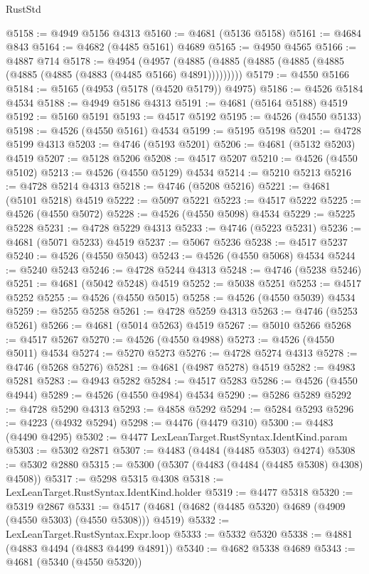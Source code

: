 \begin{lexlean}{RustStd}
\begin{coremodule}
@5158 := @4949 @5156 @4313
@5160 := @4681 (@5136 @5158)
@5161 := @4684 @843
@5164 := @4682 (@4485 @5161) @4689
@5165 := @4950 @4565
@5166 := @4887 @714
@5178 := @4954
    (@4957 (@4885 (@4885 (@4885 (@4885 (@4885 (@4885 (@4885 (@4883 (@4485 @5166) @4891)))))))))
@5179 := @4550 @5166
@5184 := @5165 (@4953 (@5178 (@4520 @5179)) @4975)
@5186 := @4526 @5184 @4534
@5188 := @4949 @5186 @4313
@5191 := @4681 (@5164 @5188) @4519
@5192 := @5160 @5191
@5193 := @4517 @5192
@5195 := @4526 (@4550 @5133)
@5198 := @4526 (@4550 @5161) @4534
@5199 := @5195 @5198
@5201 := @4728 @5199 @4313
@5203 := @4746 (@5193 @5201)
@5206 := @4681 (@5132 @5203) @4519
@5207 := @5128 @5206
@5208 := @4517 @5207
@5210 := @4526 (@4550 @5102)
@5213 := @4526 (@4550 @5129) @4534
@5214 := @5210 @5213
@5216 := @4728 @5214 @4313
@5218 := @4746 (@5208 @5216)
@5221 := @4681 (@5101 @5218) @4519
@5222 := @5097 @5221
@5223 := @4517 @5222
@5225 := @4526 (@4550 @5072)
@5228 := @4526 (@4550 @5098) @4534
@5229 := @5225 @5228
@5231 := @4728 @5229 @4313
@5233 := @4746 (@5223 @5231)
@5236 := @4681 (@5071 @5233) @4519
@5237 := @5067 @5236
@5238 := @4517 @5237
@5240 := @4526 (@4550 @5043)
@5243 := @4526 (@4550 @5068) @4534
@5244 := @5240 @5243
@5246 := @4728 @5244 @4313
@5248 := @4746 (@5238 @5246)
@5251 := @4681 (@5042 @5248) @4519
@5252 := @5038 @5251
@5253 := @4517 @5252
@5255 := @4526 (@4550 @5015)
@5258 := @4526 (@4550 @5039) @4534
@5259 := @5255 @5258
@5261 := @4728 @5259 @4313
@5263 := @4746 (@5253 @5261)
@5266 := @4681 (@5014 @5263) @4519
@5267 := @5010 @5266
@5268 := @4517 @5267
@5270 := @4526 (@4550 @4988)
@5273 := @4526 (@4550 @5011) @4534
@5274 := @5270 @5273
@5276 := @4728 @5274 @4313
@5278 := @4746 (@5268 @5276)
@5281 := @4681 (@4987 @5278) @4519
@5282 := @4983 @5281
@5283 := @4943 @5282
@5284 := @4517 @5283
@5286 := @4526 (@4550 @4944)
@5289 := @4526 (@4550 @4984) @4534
@5290 := @5286 @5289
@5292 := @4728 @5290 @4313
@5293 := @4858 @5292
@5294 := @5284 @5293
@5296 := @4223 (@4932 @5294)
@5298 := @4476 (@4479 @310)
@5300 := @4483 (@4490 @4295)
@5302 := @4477 LexLeanTarget.RustSyntax.IdentKind.param
@5303 := @5302 @2871
@5307 := @4483 (@4484 (@4485 @5303) @4274)
@5308 := @5302 @2880
@5315 := @5300 (@5307 (@4483 (@4484 (@4485 @5308) @4308) @4508))
@5317 := @5298 @5315 @4308
@5318 := LexLeanTarget.RustSyntax.IdentKind.holder
@5319 := @4477 @5318
@5320 := @5319 @2867
@5331 := @4517 (@4681 (@4682 (@4485 @5320) @4689 (@4909 (@4550 @5303) (@4550 @5308))) @4519)
@5332 := LexLeanTarget.RustSyntax.Expr.loop
@5333 := @5332 @5320
@5338 := @4881 (@4883 @4494 (@4883 @4499 @4891))
@5340 := @4682 @5338 @4689
@5343 := @4681 (@5340 (@4550 @5320))

\end{coremodule}
\end{lexlean}
